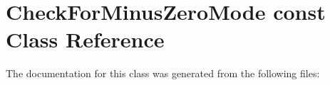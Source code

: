 \hypertarget{classCheckForMinusZeroMode_01const}{}\section{Check\+For\+Minus\+Zero\+Mode const Class Reference}
\label{classCheckForMinusZeroMode_01const}


The documentation for this class was generated from the following files\+: